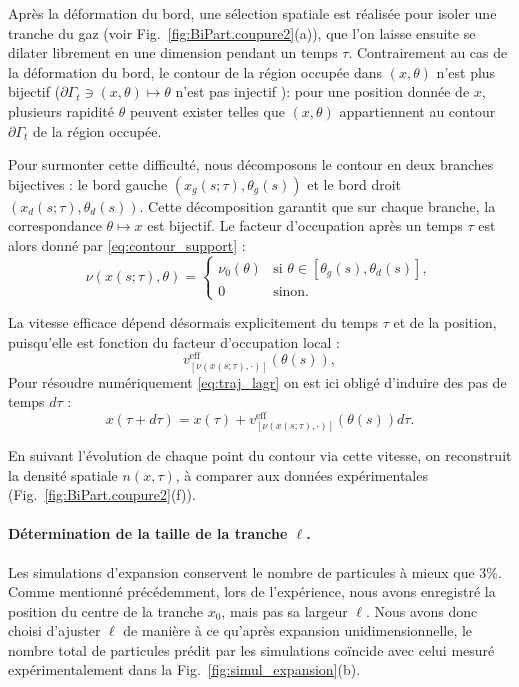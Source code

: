 Après la déformation du bord, une sélection spatiale est réalisée pour isoler une tranche du gaz (voir Fig.~\ref{fig:BiPart.coupure2}(a)), que l’on laisse ensuite se dilater librement en une dimension pendant un temps \(\tau\). Contrairement au cas de la déformation du bord, le contour de la région occupée dans $(x,\theta)$ n’est plus bijectif ($\partial \Gamma_t \ni (x,\theta) \mapsto \theta $ n'est pas injectif ): pour une position donnée de $x$, plusieurs rapidité $\theta$ peuvent exister telles que $(x,\theta)$ appartiennent au contour $\partial \Gamma_t$ de la région occupée.

Pour surmonter cette difficulté, nous décomposons le contour en deux branches bijectives : le bord gauche \((x_g(s;\tau), \theta_g(s))\) et le bord droit \((x_d(s;\tau), \theta_d(s))\). Cette décomposition garantit que sur chaque branche, la correspondance \(\theta \mapsto x\) est bijectif. Le facteur d’occupation après un temps \(\tau\) est alors donné par \eqref{eq:contour_support} :
\begin{equation}
\label{eq:contour_exp}
\nu ( x(s;\tau), \theta ) = 
\begin{cases}
\nu_0(\theta) & \text{si } \theta \in [\theta_g(s), \theta_d(s)], \\
0 & \text{sinon}.
\end{cases}
\end{equation}

La vitesse efficace dépend désormais explicitement du temps $\tau$ et de la position, puisqu’elle est fonction du facteur d’occupation local :
\[
v^{\mathrm{eff}}_{[\nu(x(s;\tau),\cdot)]}(\theta(s)),
\]
Pour résoudre numériquement \eqref{eq:traj_lagr} on est ici obligé d'induire des pas de temps $d\tau$ : 
\[
	x(\tau +d\tau ) = x(\tau ) + v^{\mathrm{eff}}_{[\nu(x(s;\tau),\cdot)]} (\theta(s))d \tau.
\]

En suivant l’évolution de chaque point du contour via cette vitesse, on reconstruit la densité spatiale \(n(x,\tau)\), à comparer aux données expérimentales (Fig.~\ref{fig:BiPart.coupure2}(f)).

\medskip

\paragraph{Détermination de la taille de la tranche \(\ell\).}

Les simulations d’expansion conservent le nombre de particules à mieux que \(3\%\). Comme mentionné précédemment, lors de l’expérience, nous avons enregistré la position du centre de la tranche \(x_0\), mais pas sa largeur \(\ell\).  
Nous avons donc choisi d’ajuster \(\ell\) de manière à ce qu’après expansion unidimensionnelle, le nombre total de particules prédit par les simulations coïncide avec celui mesuré expérimentalement dans la Fig.~\ref{fig:simul_expansion}(b).

